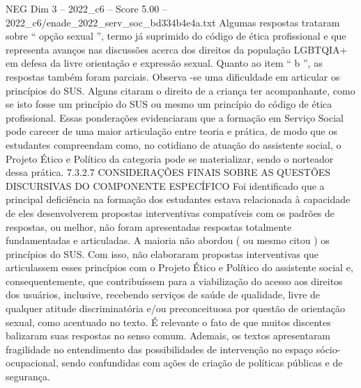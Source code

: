 \begin{textsample}{NEG Dim 3 – 2022\_c6 – Score 5.00 – 2022\_c6/enade\_2022\_serv\_soc\_bd334b4e4a.txt}
Algumas respostas trataram sobre “ opção sexual ”, termo já suprimido do código de ética profissional e que representa avanços nas discussões acerca dos direitos da população LGBTQIA+ em defesa da livre orientação e expressão sexual.
Quanto ao item “ b ”, as respostas também foram parciais.
Observa -se uma dificuldade em articular os princípios do SUS.
Alguns citaram o direito de a criança ter acompanhante, como se isto fosse um princípio do SUS ou mesmo um princípio do código de ética profissional.
Essas ponderações evidenciaram que a formação em Serviço Social pode carecer de uma maior articulação entre teoria e prática, de modo que os estudantes compreendam como, no cotidiano de atuação do assistente social, o Projeto Ético e Político da categoria pode se materializar, sendo o norteador dessa prática. 7.3.2.7 CONSIDERAÇÕES FINAIS SOBRE AS QUESTÕES DISCURSIVAS DO COMPONENTE ESPECÍFICO Foi identificado que a principal deficiência na formação dos estudantes estava relacionada à capacidade de eles desenvolverem propostas interventivas compatíveis com os padrões de respostas, ou melhor, não foram apresentadas respostas totalmente fundamentadas e articuladas.
A maioria não abordou ( ou mesmo citou ) os princípios do SUS.
Com isso, não elaboraram propostas interventivas que articulassem esses princípios com o Projeto Ético e Político do assistente social e, consequentemente, que contribuíssem para a viabilização do acesso aos direitos dos usuários, inclusive, recebendo serviços de saúde de qualidade, livre de qualquer atitude discriminatória e/ou preconceituosa por questão de orientação sexual, como acentuado no texto.
É relevante o fato de que muitos discentes balizaram suas respostas no senso comum.
Ademais, os textos apresentaram fragilidade no entendimento das possibilidades de intervenção no espaço sócio-ocupacional, sendo confundidas com ações de criação de políticas públicas e de segurança.

\end{textsample}
